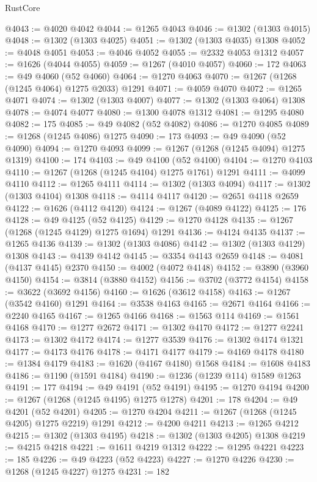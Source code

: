 \begin{lexlean}{RustCore}
\begin{coremodule}
@4043 := @4020 @4042
@4044 := @1265 @4043
@4046 := @1302 (@1303 @4015)
@4048 := @1302 (@1303 @4025)
@4051 := @1302 (@1303 @4035) @1308
@4052 := @4048 @4051
@4053 := @4046 @4052
@4055 := @2332 @4053 @1312
@4057 := @1626 (@4044 @4055)
@4059 := @1267 (@4010 @4057)
@4060 := 172
@4063 := @49 @4060 (@52 @4060)
@4064 := @1270 @4063
@4070 := @1267 (@1268 (@1245 @4064) @1275 @2033) @1291
@4071 := @4059 @4070
@4072 := @1265 @4071
@4074 := @1302 (@1303 @4007)
@4077 := @1302 (@1303 @4064) @1308
@4078 := @4074 @4077
@4080 := @1300 @4078 @1312
@4081 := @1295 @4080
@4082 := 175
@4085 := @49 @4082 (@52 @4082)
@4086 := @1270 @4085
@4089 := @1268 (@1245 @4086) @1275
@4090 := 173
@4093 := @49 @4090 (@52 @4090)
@4094 := @1270 @4093
@4099 := @1267 (@1268 (@1245 @4094) @1275 @1319)
@4100 := 174
@4103 := @49 @4100 (@52 @4100)
@4104 := @1270 @4103
@4110 := @1267 (@1268 (@1245 @4104) @1275 @1761) @1291
@4111 := @4099 @4110
@4112 := @1265 @4111
@4114 := @1302 (@1303 @4094)
@4117 := @1302 (@1303 @4104) @1308
@4118 := @4114 @4117
@4120 := @2651 @4118 @2659
@4122 := @1626 (@4112 @4120)
@4124 := @1267 (@4089 @4122)
@4125 := 176
@4128 := @49 @4125 (@52 @4125)
@4129 := @1270 @4128
@4135 := @1267 (@1268 (@1245 @4129) @1275 @1694) @1291
@4136 := @4124 @4135
@4137 := @1265 @4136
@4139 := @1302 (@1303 @4086)
@4142 := @1302 (@1303 @4129) @1308
@4143 := @4139 @4142
@4145 := @3354 @4143 @2659
@4148 := @4081 (@4137 @4145) @2370
@4150 := @4002 (@4072 @4148)
@4152 := @3890 (@3960 @4150)
@4154 := @3814 (@3880 @4152)
@4156 := @3702 (@3772 @4154)
@4158 := @3622 (@3692 @4156)
@4160 := @1626 (@3612 @4158)
@4163 := @1267 (@3542 @4160) @1291
@4164 := @3538 @4163
@4165 := @2671 @4164
@4166 := @2240 @4165
@4167 := @1265 @4166
@4168 := @1563 @114
@4169 := @1561 @4168
@4170 := @1277 @2672
@4171 := @1302 @4170
@4172 := @1277 @2241
@4173 := @1302 @4172
@4174 := @1277 @3539
@4176 := @1302 @4174 @1321
@4177 := @4173 @4176
@4178 := @4171 @4177
@4179 := @4169 @4178
@4180 := @1384 @4179
@4183 := @1620 (@4167 @4180) @1568
@4184 := @1608 @4183
@4186 := @1190 (@1591 @4184)
@4190 := @1236 (@1239 @114) @1589 @1263
@4191 := 177
@4194 := @49 @4191 (@52 @4191)
@4195 := @1270 @4194
@4200 := @1267 (@1268 (@1245 @4195) @1275 @1278)
@4201 := 178
@4204 := @49 @4201 (@52 @4201)
@4205 := @1270 @4204
@4211 := @1267 (@1268 (@1245 @4205) @1275 @2219) @1291
@4212 := @4200 @4211
@4213 := @1265 @4212
@4215 := @1302 (@1303 @4195)
@4218 := @1302 (@1303 @4205) @1308
@4219 := @4215 @4218
@4221 := @1611 @4219 @1312
@4222 := @1295 @4221
@4223 := 185
@4226 := @49 @4223 (@52 @4223)
@4227 := @1270 @4226
@4230 := @1268 (@1245 @4227) @1275
@4231 := 182

\end{coremodule}
\end{lexlean}
